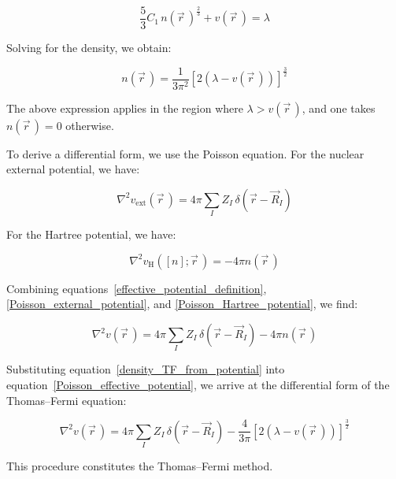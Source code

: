 \begin{equation}
    \frac{5}{3}C_1\,n(\vec{r}\,)^{\frac{2}{3}}+v(\vec{r}\,)=\lambda
\label{Thomas_Fermi_equation_compact}
\end{equation}

Solving for the density, we obtain:

\begin{equation}
    n(\vec{r}\,)=\frac{1}{3\pi^2}\left[2\left(\lambda-v(\vec{r}\,)\right)\right]^{\frac{3}{2}}
\label{density_TF_from_potential}
\end{equation}

The above expression applies in the region where $\lambda>v(\vec{r}\,)$, and one takes $n(\vec{r}\,)=0$ otherwise.

To derive a differential form, we use the Poisson equation.
For the nuclear external potential, we have:

\begin{equation}
    \nabla^2 v_\mathrm{ext}(\vec{r}\,)=4\pi\sum_I Z_I\,\delta\left(\vec{r}-\vec{R}_I\right)
\label{Poisson_external_potential}
\end{equation}

For the Hartree potential, we have:

\begin{equation}
    \nabla^2 v_\mathrm{H}([n];\vec{r}\,)=-4\pi n(\vec{r}\,)
\label{Poisson_Hartree_potential}
\end{equation}

Combining equations~\eqref{effective_potential_definition}, \eqref{Poisson_external_potential}, and \eqref{Poisson_Hartree_potential}, we find:

\begin{equation}
    \nabla^2 v(\vec{r}\,)=4\pi\sum_I Z_I\,\delta\left(\vec{r}-\vec{R}_I\right)-4\pi n(\vec{r}\,)
\label{Poisson_effective_potential}
\end{equation}

Substituting equation~\eqref{density_TF_from_potential} into equation~\eqref{Poisson_effective_potential}, we arrive at the differential form of the Thomas--Fermi equation:

\begin{equation}
    \nabla^2 v(\vec{r}\,)=4\pi\sum_I Z_I\,\delta\left(\vec{r}-\vec{R}_I\right)-\frac{4}{3\pi}\left[2\left(\lambda-v(\vec{r}\,)\right)\right]^{\frac{3}{2}}
\label{differential_form_Thomas_Fermi_equation}
\end{equation}

This procedure constitutes the Thomas--Fermi method.

